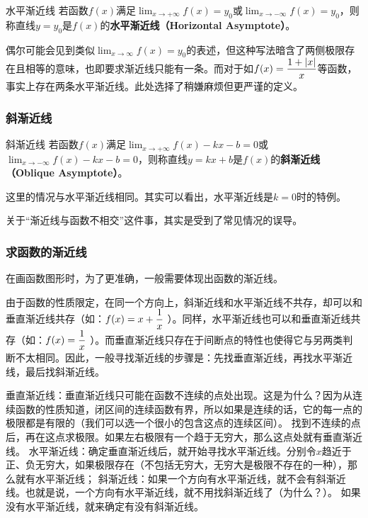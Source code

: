 \begin{definition}{水平渐近线}
若函数$f(x)$满足$\displaystyle \lim_{x\to +\infty}f(x)=y_0$或$\displaystyle \lim_{x\to -\infty}f(x)=y_0$，则称直线$y=y_0$是$f(x)$的\textbf{水平渐近线（Horizontal Asymptote）}。
\end{definition}

偶尔可能会见到类似$\displaystyle \lim_{x\to \infty}f(x)=y_0$的表述，但这种写法暗含了两侧极限存在且相等的意味，也即要求渐近线只能有一条。而对于如$\displaystyle f(x)={1+|x|\over x}$等函数，事实上存在两条水平渐近线。此处选择了稍嫌麻烦但更严谨的定义。

\subsubsection{斜渐近线}

\begin{definition}{斜渐近线}
若函数$f(x)$满足$\displaystyle \lim_{x\to +\infty}f(x)-kx-b=0$或$\displaystyle \lim_{x\to -\infty}f(x)-kx-b=0$，则称直线$y=kx+b$是$f(x)$的\textbf{斜渐近线（Oblique Asymptote）}。
\end{definition}

这里的情况与水平渐近线相同。其实可以看出，水平渐近线是$k=0$时的特例。

关于“渐近线与函数不相交”这件事，其实是受到了常见情况的误导。

\subsubsection{求函数的渐近线}

在画函数图形时，为了更准确，一般需要体现出函数的渐近线。

由于函数的性质限定，在同一个方向上，斜渐近线和水平渐近线不共存，却可以和垂直渐近线共存（如：$\displaystyle f(x)=x+{1\over x}$ ）。同样，水平渐近线也可以和垂直渐近线共存（如：$\displaystyle f(x)={1\over x}$ ）。而垂直渐近线只存在于间断点的特性也使得它与另两类判断不太相同。因此，一般寻找渐近线的步骤是：先找垂直渐近线，再找水平渐近线，最后找斜渐近线。

垂直渐近线：垂直渐近线只可能在函数不连续的点处出现。这是为什么？因为从连续函数的性质知道，闭区间的连续函数有界，所以如果是连续的话，它的每一点的极限都是有限的（我们可以选一个很小的包含这点的连续区间）。
找到不连续的点后，再在这点求极限。如果左右极限有一个趋于无穷大，那么这点处就有垂直渐近线。
水平渐近线：确定垂直渐近线后，就开始寻找水平渐近线。分别令$x$趋近于正、负无穷大，如果极限存在（不包括无穷大，无穷大是极限不存在的一种），那么就有水平渐近线；
斜渐近线：如果一个方向有水平渐近线，就不会有斜渐近线。也就是说，一个方向有水平渐近线，就不用找斜渐近线了（为什么？）。 如果没有水平渐近线，就来确定有没有斜渐近线。



